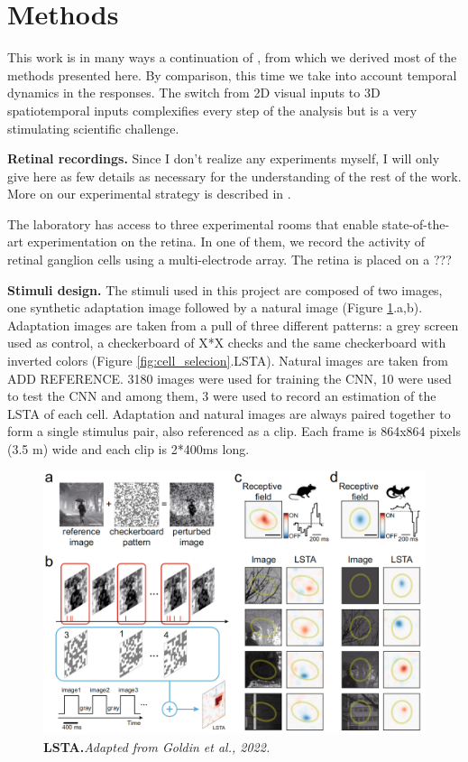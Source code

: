 \section{Methods}\label{sec:methods}

This work is in many ways a continuation of
\cite{goldin_context-dependent_2022}, from which we derived most of the methods
presented here. By comparison, this time we take into account temporal dynamics
in the responses. The switch from 2D visual inputs to 3D spatiotemporal inputs
complexifies every step of the analysis but is a very stimulating scientific
challenge.

\textbf{Retinal recordings.}
Since I don't realize any experiments myself, I will only give here as few
details as necessary for the understanding of the rest of the work. More on our
experimental strategy is described in \cite{goldin_context-dependent_2022}.

The laboratory has access to three experimental rooms that enable
state-of-the-art experimentation
on the retina.	In one of them, we record the activity of retinal ganglion
cells using a multi-electrode array. The retina is placed on a ???

\textbf{Stimuli design.}
The stimuli used in this project are composed of two images, one synthetic
adaptation image followed by a natural image (Figure \ref{fig:LSTA}.a,b).
Adaptation images are taken from
a pull of three different patterns: a grey screen used as control, a
checkerboard of X*X checks and the same checkerboard with inverted colors
(Figure \ref{fig:cell_selecion}.LSTA). Natural images are taken from ADD
REFERENCE. 3180 images were used for
training the CNN, 10 were used to test the CNN and among them, 3 were used to
record an estimation of the LSTA of each cell.
Adaptation and natural images are always paired together to form a single
stimulus pair, also referenced as a clip. Each frame is 864x864 pixels (3.5
\textmu m) wide and each clip is 2*400ms long. %

\begin{figure}
    \centering
    \includegraphics[width=\textwidth]{pics/LSTAExplainV2.png}
    \caption{\textbf{LSTA.}\textit{Adapted from Goldin et al., 2022.}  }
    \label{fig:LSTA}
\end{figure}

